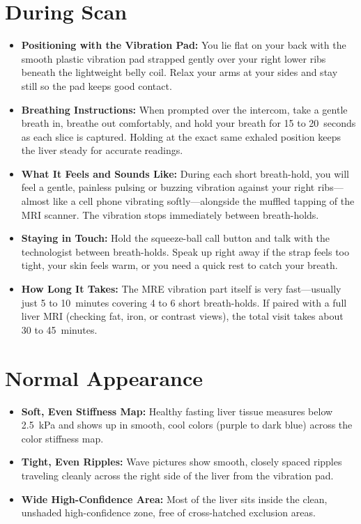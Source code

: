 \section{During Scan}
\begin{itemize}
\item \textbf{Positioning with the Vibration Pad:} You lie flat on your back with the smooth plastic vibration pad strapped gently over your right lower ribs beneath the lightweight belly coil. Relax your arms at your sides and stay still so the pad keeps good contact.
\item \textbf{Breathing Instructions:} When prompted over the intercom, take a gentle breath in, breathe out comfortably, and hold your breath for 15 to 20~seconds as each slice is captured. Holding at the exact same exhaled position keeps the liver steady for accurate readings.
\item \textbf{What It Feels and Sounds Like:} During each short breath-hold, you will feel a gentle, painless pulsing or buzzing vibration against your right ribs---almost like a cell phone vibrating softly---alongside the muffled tapping of the MRI scanner. The vibration stops immediately between breath-holds.
\item \textbf{Staying in Touch:} Hold the squeeze-ball call button and talk with the technologist between breath-holds. Speak up right away if the strap feels too tight, your skin feels warm, or you need a quick rest to catch your breath.
\item \textbf{How Long It Takes:} The MRE vibration part itself is very fast---usually just 5 to 10~minutes covering 4 to 6 short breath-holds. If paired with a full liver MRI (checking fat, iron, or contrast views), the total visit takes about 30 to 45~minutes.
\end{itemize}

\section{Normal Appearance}
\begin{itemize}
\item \textbf{Soft, Even Stiffness Map:} Healthy fasting liver tissue measures below 2.5~kPa and shows up in smooth, cool colors (purple to dark blue) across the color stiffness map.
\item \textbf{Tight, Even Ripples:} Wave pictures show smooth, closely spaced ripples traveling cleanly across the right side of the liver from the vibration pad.
\item \textbf{Wide High-Confidence Area:} Most of the liver sits inside the clean, unshaded high-confidence zone, free of cross-hatched exclusion areas.
\end{itemize}

